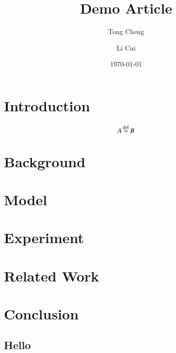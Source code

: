 \documentclass[a4paper, 12pt]{article}
\title{Demo Article}
\author{
    Tong Cheng \\ \bnu
    \and
    Li Cui \\ \bnu
}
\date{\today}
\begin{document}
\maketitle
\begin{abstract}
    \lipsum[1]
\end{abstract}

\section{Introduction}
\[ A \operatorname*{\stackrel{\mathrm{def}}{=}} B \]


\section{Background}
    \lipsum[3]
    \lipsum[4]

\section{Model}
    \lipsum[4]

\section{Experiment}
    \lipsum[5]

\section{Related Work}
    \lipsum[6]
    \cite{Nobody06}

\section{Conclusion}
    \lipsum[7]




\begin{appendices}
    \section{Hello} 
\end{appendices}
\end{document}
